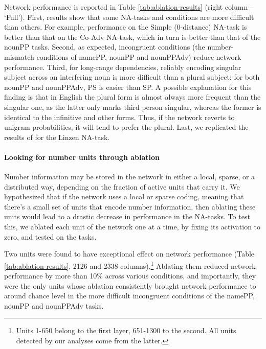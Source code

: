 Network performance is reported in Table \ref{tab:ablation-results}
(right column -- `Full'). First, results show that some NA-tasks and
conditions are more difficult than others. For example, performance on
the Simple (0-distance) NA-task is better than that on the Co-Adv
NA-task, which in turn is better than that of the nounPP
tasks. Second, as expected, incongruent conditions (the
number-mismatch conditions of namePP, nounPP and nounPPAdv) reduce
network performance. Third, for long-range dependencies, reliably
encoding singular subject across an interfering noun is more difficult
than a plural subject: for both nounPP and nounPPAdv, PS is easier
than SP. A possible explanation for this finding is that in English the plural form is
almost always more frequent than the singular one, as the latter only
marks third person singular, whereas the former is identical to the
infinitive and other forms. Thus, if the network reverts to unigram
probabilities, it will tend to prefer the plural. Last, we replicated
the results of  for the Linzen NA-task.

\paragraph{Looking for number units through ablation} Number
information may be stored in the network in either a local, sparse, or
a distributed way, depending on the fraction of active units that
carry it.  We hypothesized that if the network uses a local or sparse
coding, meaning that there's a small set of units that encode number
information, then ablating these units would lead to a drastic
decrease in performance in the NA-tasks.  To test this, we ablated
each unit of the network one at a time, by fixing its activation to zero,
and tested on the tasks.

Two units were found to have exceptional effect on network performance
(Table \ref{tab:ablation-results}, \unit{2}{126} and \unit{2}{338}
columns).\footnote{Units 1-650 belong to the first layer, 651-1300 to
  the second. All units detected by our analyses come from the latter.} Ablating them reduced network performance by more than 10\%
across various conditions, and importantly, they were the only units
whose ablation consistently brought network performance to around
chance level in the more difficult incongruent conditions of the
namePP, nounPP and nounPPAdv
tasks. 

